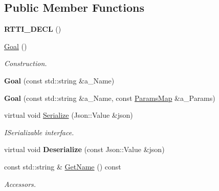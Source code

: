 \subsection*{Public Member Functions}
\begin{DoxyCompactItemize}
\item 
\mbox{\label{class_goal_a7d79f22200beca322bcd7d233377169c}} 
{\bfseries R\+T\+T\+I\+\_\+\+D\+E\+CL} ()
\item 
\mbox{\label{class_goal_aef5013c9bf548e51178f58da869d508a}} 
\hyperlink{class_goal_aef5013c9bf548e51178f58da869d508a}{Goal} ()
\begin{DoxyCompactList}\small\item\em Construction. \end{DoxyCompactList}\item 
\mbox{\label{class_goal_a30de5f1c4006f0158cba622816652c07}} 
{\bfseries Goal} (const std\+::string \&a\+\_\+\+Name)
\item 
\mbox{\label{class_goal_a75f87281e05255c70796ea73a17a9ef5}} 
{\bfseries Goal} (const std\+::string \&a\+\_\+\+Name, const \hyperlink{class_params_map}{Params\+Map} \&a\+\_\+\+Params)
\item 
\mbox{\label{class_goal_a2096d4ea4b752a795a96f50ebb699a16}} 
virtual void \hyperlink{class_goal_a2096d4ea4b752a795a96f50ebb699a16}{Serialize} (Json\+::\+Value \&json)
\begin{DoxyCompactList}\small\item\em I\+Serializable interface. \end{DoxyCompactList}\item 
\mbox{\label{class_goal_a813bc3e77a58fcbbc2516ea392e3b49e}} 
virtual void {\bfseries Deserialize} (const Json\+::\+Value \&json)
\item 
\mbox{\label{class_goal_a64b7107f65dcc2342abf96fbfbe4840e}} 
const std\+::string \& \hyperlink{class_goal_a64b7107f65dcc2342abf96fbfbe4840e}{Get\+Name} () const
\begin{DoxyCompactList}\small\item\em Accessors. \end{DoxyCompactList}\item 

\end{DoxyCompactItemize}
